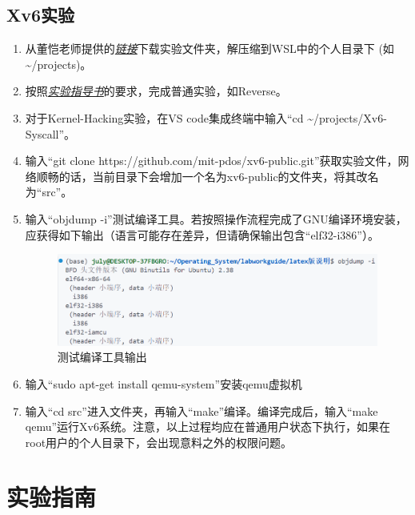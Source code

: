 \documentclass[fontset=ubuntu]{ctexart}
\let\oldhref\href{}
\renewcommand{\href}[2]{\oldhref{#1}{\textit{#2}}}
\begin{document}
\subsection{Xv6实验}

\begin{enumerate}
    \item 从董恺老师提供的\href{https://seunic-my.sharepoint.cn/personal/101011912_seu_edu_cn/_layouts/15/onedrive.aspx?id=/personal/101011912_seu_edu_cn/Documents/教学/Teaching/操作系统/OSC_labs/Xv6.labworks.7z&parent=/personal/101011912_seu_edu_cn/Documents/教学/Teaching/操作系统/OSC_labs}{链接}下载实验文件夹，解压缩到WSL中的个人目录下 (如\~{}/projects)。
    \item 按照\href{https://www.overleaf.com/project/604ac6e691e6cf4d8ba0b24a}{实验指导书}的要求，完成普通实验，如Reverse。
    \item 对于Kernel-Hacking实验，在VS code集成终端中输入“cd \~{}/projects/Xv6-Syscall”。
    \item 输入“git clone https://github.com/mit-pdos/xv6-public.git”获取实验文件，网络顺畅的话，当前目录下会增加一个名为xv6-public的文件夹，将其改名为“src”。
    \item 输入“objdump -i”测试编译工具。若按照操作流程完成了GNU编译环境安装，应获得如下输出（语言可能存在差异，但请确保输出包含“elf32-i386”）。
          \begin{figure}[htbp]
              \centering
              \includegraphics[width=\textwidth]{./README.assets/objdump.png}
              \caption{测试编译工具输出}
          \end{figure}
    \item 输入“sudo apt-get install qemu-system”安装qemu虚拟机
    \item 输入“cd src”进入文件夹，再输入“make”编译。编译完成后，输入“make qemu”运行Xv6系统。注意，以上过程均应在普通用户状态下执行，如果在root用户的个人目录下，会出现意料之外的权限问题。
\end{enumerate}

\newpage{}

\section{实验指南}
\end{document}

